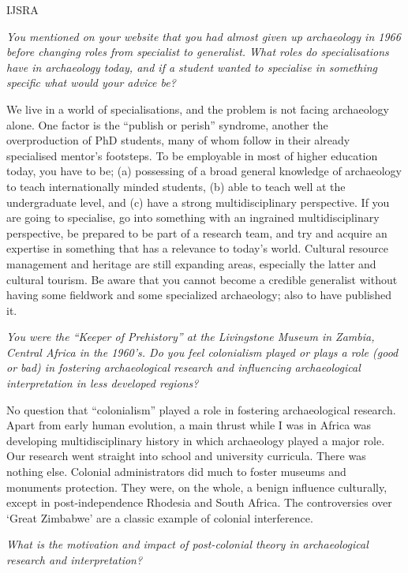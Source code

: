 \begin{labeling}{IJSRA}
\item[IJSRA]\emph{You mentioned on your website that you had almost given up archaeology in 1966 before changing roles from specialist to generalist.  What roles do specialisations have in archaeology today, and if a student wanted to specialise in something specific what would your advice be?}

\item[BMF] We live in a world of specialisations, and the problem is not facing archaeology alone. One factor is the “publish or perish” syndrome, another the overproduction of PhD students, many of whom follow in their already specialised mentor’s footsteps. To be employable in most of higher education today, you have to be; (a) possessing of a broad general knowledge of archaeology to teach internationally minded students, (b) able to teach well at the undergraduate level, and (c) have a strong multidisciplinary perspective. If you are going to specialise, go into something with an ingrained multidisciplinary perspective, be prepared to be part of a research team, and try and acquire an expertise in something that has a relevance to today’s world. Cultural resource management and heritage are still expanding areas, especially the latter and cultural tourism. Be aware that you cannot become a credible generalist without having some fieldwork and some specialized archaeology; also to have published it.	

\item[IJSRA]\emph{You were the “Keeper of Prehistory” at the Livingstone Museum in Zambia, Central Africa in the 1960’s. Do you feel colonialism played or plays a role (good or bad) in fostering archaeological research and influencing archaeological interpretation in less developed regions?}

\item[BMF] No question that “colonialism” played a role in fostering archaeological research. Apart from early human evolution, a main thrust while I was in Africa was developing multidisciplinary history in which archaeology played a major role. Our research went straight into school and university curricula. There was nothing else. Colonial administrators did much to foster museums and monuments protection. They were, on the whole, a benign influence culturally, except in post-independence Rhodesia and South Africa. The controversies over ‘Great Zimbabwe’ are a classic example of colonial interference.

\item[IJSRA] \emph{What is the motivation and impact of post-colonial theory in archaeological research and interpretation?}


\end{labeling}
